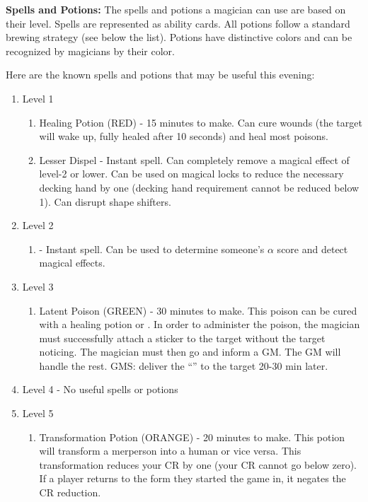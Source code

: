 \documentclass[blue]{NeptuneBall}
\begin{document}
\name{\bGMPotions{}}

{\bf Spells and Potions:}
The spells and potions a magician can use are based on their level. Spells are represented as ability cards. All potions follow a standard brewing strategy (see below the list). Potions have distinctive colors and can be recognized by magicians by their color. 

Here are the known spells and potions that may be useful this evening:
\begin{enumerate}
  \item Level 1
   \begin{enumerate}
     \item Healing Potion (RED) - 15 minutes to make. Can cure wounds (the target will wake up, fully healed after 10 seconds) and heal most poisons. 
     \item Lesser Dispel - Instant spell. Can completely remove a magical effect of level-2 or lower. Can be used on magical locks to reduce the necessary decking hand by one (decking hand requirement cannot be reduced below 1). Can disrupt shape shifters.
   \end{enumerate}
  \item Level 2
   \begin{enumerate}
     \item \aPerceive{} - Instant spell. Can be used to determine someone's $\alpha$ score and detect magical effects.
   \end{enumerate}
  \item Level 3
     \begin{enumerate}
     \item Latent Poison (GREEN) - 30 minutes to make. This poison can be cured with a healing potion or \aFirstAid{}. In order to administer the poison, the magician must successfully attach a sticker to the target without the target noticing. The magician must then go and inform a GM. The GM will handle the rest. GMS: deliver the ``\iLatentPoisonEffect{}'' to the target 20-30 min later.
   \end{enumerate}
   \item Level 4 - No useful spells or potions
   \item Level 5
    \begin{enumerate}
     \item Transformation Potion (ORANGE) - 20 minutes to make. This potion will transform a merperson into a human or vice versa. This transformation reduces your CR by one (your CR cannot go below zero). If a player returns to the form they started the game in, it negates the CR reduction.

\end{enumerate}
\end{enumerate}
\end{document}
